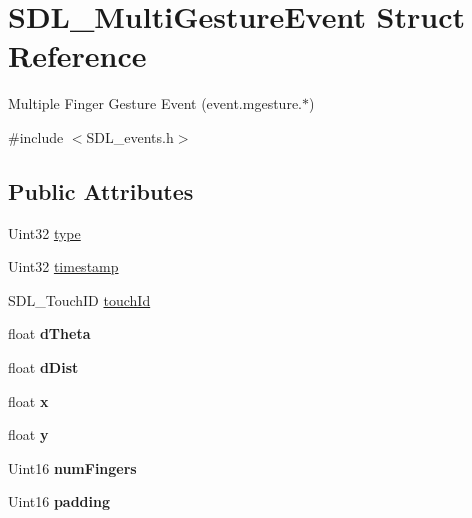 \hypertarget{structSDL__MultiGestureEvent}{}\section{S\+D\+L\+\_\+\+Multi\+Gesture\+Event Struct Reference}
\label{structSDL__MultiGestureEvent}


Multiple Finger Gesture Event (event.\+mgesture.$\ast$)  




{\ttfamily \#include $<$S\+D\+L\+\_\+events.\+h$>$}

\subsection*{Public Attributes}
\begin{DoxyCompactItemize}
\item 
Uint32 \hyperlink{structSDL__MultiGestureEvent_ab0c7adc9a3f71cc3532bfe0ff8cc6120}{type}
\item 
Uint32 \hyperlink{structSDL__MultiGestureEvent_a7e99a98debf3ce11f6d2a2fbb3637175}{timestamp}
\item 
S\+D\+L\+\_\+\+Touch\+ID \hyperlink{structSDL__MultiGestureEvent_aa15d1201559a3c9277082af71a972dc1}{touch\+Id}
\item 
\mbox{\label{structSDL__MultiGestureEvent_a4f4a920dcf5205baa24a140df56f3153}} 
float {\bfseries d\+Theta}
\item 
\mbox{\label{structSDL__MultiGestureEvent_a351c29785c5ce3f68c4591a427265f14}} 
float {\bfseries d\+Dist}
\item 
\mbox{\label{structSDL__MultiGestureEvent_a1708fc3c788fd12cc0beb5dc05cf31ca}} 
float {\bfseries x}
\item 
\mbox{\label{structSDL__MultiGestureEvent_a264602b9c5cc027eb6a283adda428454}} 
float {\bfseries y}
\item 
\mbox{\label{structSDL__MultiGestureEvent_a6b06cf80372ce3cad40110fdb6ef0353}} 
Uint16 {\bfseries num\+Fingers}
\item 
\mbox{\label{structSDL__MultiGestureEvent_a4804ec87789e697aba138c4888bb304b}} 
Uint16 {\bfseries padding}
\end{DoxyCompactItemize}



